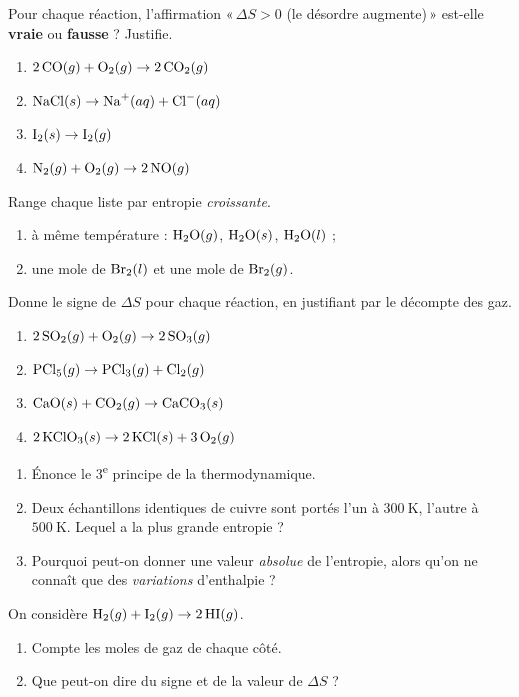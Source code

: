 \documentclass[11pt,a4paper]{article}
\begin{document}
\begin{exo}
Pour chaque réaction, l'affirmation «\,$\Delta S>0$ (le désordre augmente)\,» est-elle \textbf{vraie} ou \textbf{fausse} ? Justifie.
\begin{enumerate}[label=\alph*)]
  \item $2\,\ce{CO}(g) + \ce{O2}(g) \rightarrow 2\,\ce{CO2}(g)$
  \item $\ce{NaCl}(s) \rightarrow \ce{Na+}(aq) + \ce{Cl-}(aq)$
  \item $\ce{I2}(s) \rightarrow \ce{I2}(g)$
  \item $\ce{N2}(g) + \ce{O2}(g) \rightarrow 2\,\ce{NO}(g)$
\end{enumerate}
\end{exo}

\begin{exo}
Range chaque liste par entropie \emph{croissante}.
\begin{enumerate}[label=\alph*)]
  \item à même température : $\ce{H2O}(g)$, $\ce{H2O}(s)$, $\ce{H2O}(l)$ ;
  \item une mole de $\ce{Br2}(l)$ et une mole de $\ce{Br2}(g)$.
\end{enumerate}
\end{exo}

\begin{exo}
Donne le signe de $\Delta S$ pour chaque réaction, en justifiant par le décompte des gaz.
\begin{enumerate}[label=\alph*)]
  \item $2\,\ce{SO2}(g) + \ce{O2}(g) \rightarrow 2\,\ce{SO3}(g)$
  \item $\ce{PCl5}(g) \rightarrow \ce{PCl3}(g) + \ce{Cl2}(g)$
  \item $\ce{CaO}(s) + \ce{CO2}(g) \rightarrow \ce{CaCO3}(s)$
  \item $2\,\ce{KClO3}(s) \rightarrow 2\,\ce{KCl}(s) + 3\,\ce{O2}(g)$
\end{enumerate}
\end{exo}

\begin{exo}
\begin{enumerate}[label=\alph*)]
  \item Énonce le 3\textsuperscript{e} principe de la thermodynamique.
  \item Deux échantillons identiques de cuivre sont portés l'un à $\qty{300}{\kelvin}$, l'autre à $\qty{500}{\kelvin}$. Lequel a la plus grande entropie ?
  \item Pourquoi peut-on donner une valeur \emph{absolue} de l'entropie, alors qu'on ne connaît que des \emph{variations} d'enthalpie ?
\end{enumerate}
\end{exo}

\begin{exo}
On considère $\ce{H2}(g) + \ce{I2}(g) \rightarrow 2\,\ce{HI}(g)$.
\begin{enumerate}[label=\alph*)]
  \item Compte les moles de gaz de chaque côté.
  \item Que peut-on dire du signe et de la valeur de $\Delta S$ ?
\end{enumerate}
\end{exo}
\end{document}
